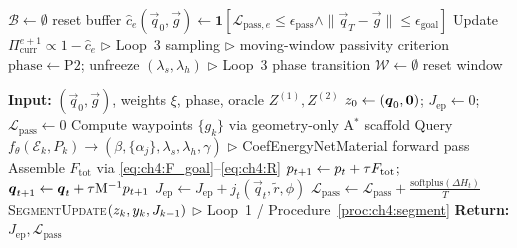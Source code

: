 \begin{algorithm}[t]
\begin{algorithmic}[1]
    \STATE $\mathcal{B} \leftarrow \emptyset$ \hfill reset buffer
  \ENDIF
  \STATE $\hat{c}_e(\vec{q}_0,\vec{g}) \leftarrow
         \mathbf{1}\!\left[
         \mathcal{L}_{\mathrm{pass},e}\leq\epsilon_{\mathrm{pass}}
         \wedge \|\vec{q}_T-\vec{g}\|\leq\epsilon_{\mathrm{goal}}
         \right]$
  \STATE Update $\Pi^{e+1}_{\mathrm{curr}} \propto 1-\hat{c}_e$
         \hfill $\triangleright$ Loop~3 sampling
      \hfill $\triangleright$ moving-window passivity criterion
    \STATE $\mathrm{phase}\leftarrow\mathrm{P2}$;\;
           unfreeze $(\lambda_s,\lambda_h)$
           \hfill $\triangleright$ Loop~3 phase transition
    \STATE $\mathcal{W} \leftarrow \emptyset$ \hfill reset window
  \ENDIF
\ENDFOR
\end{algorithmic}
\end{algorithm}

\begin{algorithm}[t]
\caption{Episode Procedure (one forward rollout + Loop~2 gradient)}
\label{algo:ch4:episode}
\begin{algorithmic}[1]
\STATE \textbf{Input:} $(\vec{q}_0,\vec{g})$, weights $\xi$, phase, oracle $Z^{(1)},Z^{(2)}$
\STATE $z_0 \leftarrow (\boldsymbol{q}_0,\mathbf{0})$;\;
       $J_{\mathrm{ep}} \leftarrow 0$;\;
       $\mathcal{L}_{\mathrm{pass}} \leftarrow 0$
\STATE Compute waypoints $\{g_k\}$ via geometry-only A$^*$ scaffold
  \STATE Query $f_\theta(\mathcal{E}_k,P_k)\to
         (\beta,\{\alpha_j\},\lambda_s,\lambda_h,\gamma)$
         \hfill $\triangleright$ CoefEnergyNetMaterial forward pass
    \STATE Assemble $F_{\mathrm{tot}}$ via
           \eqref{eq:ch4:F_goal}--\eqref{eq:ch4:R}
    \STATE $p_{t+1}\leftarrow p_t+\tau F_{\mathrm{tot}}$;\;
           $\boldsymbol{q}_{t+1}\leftarrow\boldsymbol{q}_t+\tau\mathrm{M}^{-1}p_{t+1}$
    \STATE $J_{\mathrm{ep}} \leftarrow
           J_{\mathrm{ep}} + j_t(\vec{q}_t,\tilde{r},\phi)$
    \STATE $\mathcal{L}_{\mathrm{pass}} \leftarrow
           \mathcal{L}_{\mathrm{pass}} +
           \frac{\mathrm{softplus}(\Delta H_t)}{T}$
  \ENDFOR
  \STATE \textsc{SegmentUpdate}$(z_k,y_k,J_{k-1})$
         \hfill $\triangleright$ Loop~1 / Procedure~\ref{proc:ch4:segment}
\ENDFOR
\STATE \textbf{Return:} $J_{\mathrm{ep}}, \mathcal{L}_{\mathrm{pass}}$
\end{algorithmic}
\end{algorithm}

